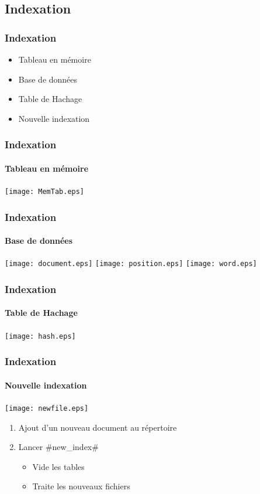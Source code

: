 \documentclass{beamer}
\begin{document}
    \subsection{Indexation}
    \begin{frame}
     \frametitle{Indexation}
     \begin{itemize}
      \item Tableau en mémoire
      \item Base de données
      \item Table de Hachage
      \item Nouvelle indexation
     \end{itemize}

    \end{frame}
    
    \begin{frame}
     \frametitle{Indexation}
     \framesubtitle{Tableau en mémoire}
     \begin{center}
     \texttt{[image: MemTab.eps]}
     \end{center}
    \end{frame}
    
    \begin{frame}
     \frametitle{Indexation}
     \framesubtitle{Base de données}
     \texttt{[image: document.eps]}
     \hfill
    \texttt{[image: position.eps]}
    \hfill
    \texttt{[image: word.eps]}
    \end{frame}
    
    \begin{frame}
     \frametitle{Indexation}
     \framesubtitle{Table de Hachage}
     \begin{center}
     \texttt{[image: hash.eps]}
     \end{center}

    \end{frame}
    
    \begin{frame}
     \frametitle{Indexation}
     \framesubtitle{Nouvelle indexation}
     \begin{center}
     \texttt{[image: newfile.eps]}
     \end{center}
     
     \begin{enumerate}
      \item Ajout d'un nouveau document au répertoire
      \item Lancer \#new\_index\#
      \begin{itemize}
      \item Vide les tables
      \item Traite les nouveaux fichiers
     \end{itemize}
     \end{enumerate}


    \end{frame}
    
\end{document}

